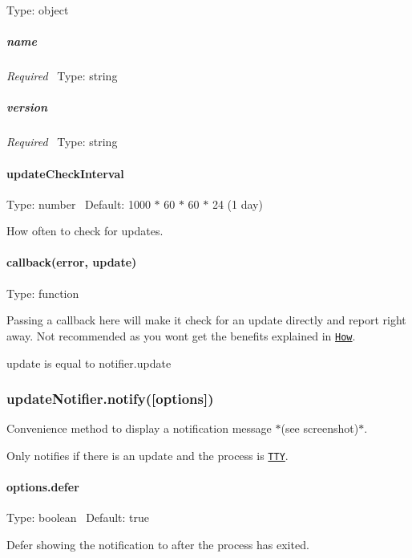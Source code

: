 Type\+: {\ttfamily object}

\subparagraph*{name}

{\itshape Required}~\newline
 Type\+: {\ttfamily string}

\subparagraph*{version}

{\itshape Required}~\newline
 Type\+: {\ttfamily string}

\paragraph*{update\+Check\+Interval}

Type\+: {\ttfamily number}~\newline
 Default\+: 1000 $\ast$ 60 $\ast$ 60 $\ast$ 24 (1 day)

How often to check for updates.

\paragraph*{callback(error, update)}

Type\+: {\ttfamily function}~\newline


Passing a callback here will make it check for an update directly and report right away. Not recommended as you won\textquotesingle{}t get the benefits explained in \href{#how}{\tt {\ttfamily How}}.

{\ttfamily update} is equal to {\ttfamily notifier.\+update}

\subsubsection*{update\+Notifier.\+notify(\mbox{[}options\mbox{]})}

Convenience method to display a notification message $\ast$(see screenshot)$\ast$.

Only notifies if there is an update and the process is \href{http://nodejs.org/api/tty.html}{\tt T\+TY}.

\paragraph*{options.\+defer}

Type\+: {\ttfamily boolean}~\newline
 Default\+: {\ttfamily true}

Defer showing the notification to after the process has exited.

